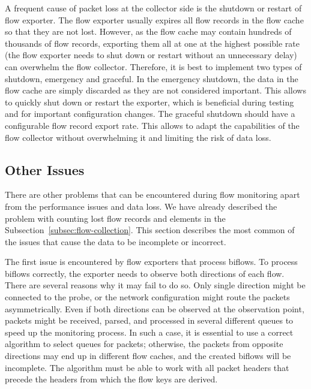 A frequent cause of packet loss at the collector side is the shutdown or restart of flow exporter. The flow exporter usually expires all flow records in the flow cache so that they are not lost. However, as the flow cache may contain hundreds of thousands of flow records, exporting them all at one at the highest possible rate (the flow exporter needs to shut down or restart without an unnecessary delay) can overwhelm the flow collector. Therefore, it is best to implement two types of shutdown, emergency and graceful. In the emergency shutdown, the data in the flow cache are simply discarded as they are not considered important. This allows to quickly shut down or restart the exporter, which is beneficial during testing and for important configuration changes. The graceful shutdown should have a configurable flow record export rate. This allows to adapt the capabilities of the flow collector without overwhelming it and limiting the risk of data loss.

\subsection{Other Issues}

There are other problems that can be encountered during flow monitoring apart from the performance issues and data loss. We have already described the problem with counting lost flow records and elements in the Subsection~\ref{subsec:flow-collection}. This section describes the most common of the issues that cause the data to be incomplete or incorrect.

The first issue is encountered by flow exporters that process biflows. To process biflows correctly, the exporter needs to observe both directions of each flow. There are several reasons why it may fail to do so. Only single direction might be connected to the probe, or the network configuration might route the packets asymmetrically. Even if both directions can be observed at the observation point, packets might be received, parsed, and processed in several different queues to speed up the monitoring process. In such a case, it is essential to use a correct algorithm to select queues for packets; otherwise, the packets from opposite directions may end up in different flow caches, and the created biflows will be incomplete. The algorithm must be able to work with all packet headers that precede the headers from which the flow keys are derived. 

